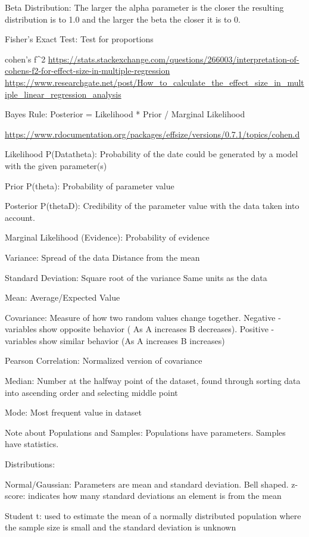 \documentclass[]{book}
\theoremstyle{definition}
\theoremstyle{definition}
\theoremstyle{definition}
\theoremstyle{remark}
\begin{document}
Beta Distribution: The larger the alpha parameter is the closer the
resulting distribution is to 1.0 and the larger the beta the closer it
is to 0.

Fisher's Exact Test: Test for proportions

cohen's f\^{}2 \textbar{}
\url{https://stats.stackexchange.com/questions/266003/interpretation-of-cohens-f2-for-effect-size-in-multiple-regression}
\textbar{}
\url{https://www.researchgate.net/post/How_to_calculate_the_effect_size_in_multiple_linear_regression_analysis}

Bayes Rule: Posterior = Likelihood * Prior / Marginal Likelihood

\url{https://www.rdocumentation.org/packages/effsize/versions/0.7.1/topics/cohen.d}

Likelihood P(Data\textbar{}theta): Probability of the date could be
generated by a model with the given parameter(s)

Prior P(theta): Probability of parameter value

Posterior P(theta\textbar{}D): Credibility of the parameter value with
the data taken into account.

Marginal Likelihood (Evidence): Probability of evidence

Variance: Spread of the data \textbar{} Distance from the mean

Standard Deviation: Square root of the variance \textbar{} Same units as
the data

Mean: Average/Expected Value

Covariance: Measure of how two random values change together. Negative -
variables show opposite behavior ( As A increases B decreases). Positive
- variables show similar behavior (As A increases B increases)

Pearson Correlation: Normalized version of covariance

Median: Number at the halfway point of the dataset, found through
sorting data into ascending order and selecting middle point

Mode: Most frequent value in dataset

Note about Populations and Samples: Populations have parameters. Samples
have statistics.

Distributions:

Normal/Gaussian: Parameters are mean and standard deviation. Bell
shaped. z-score: indicates how many standard deviations an element is
from the mean

Student t: used to estimate the mean of a normally distributed
population where the sample size is small and the standard deviation is
unknown
\end{document}
